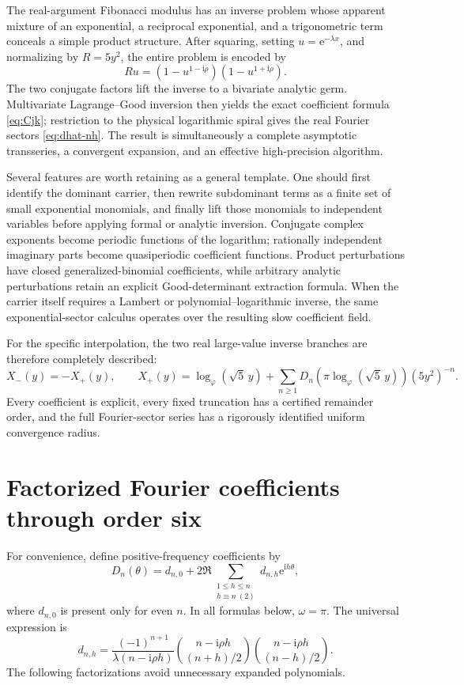 \documentclass[11pt,oneside]{article}
\numberwithin{equation}{section}
\theoremstyle{plain}
\theoremstyle{definition}
\theoremstyle{remark}
\newcommand{\e}{\mathrm e}
\newcommand{\ii}{\mathrm i}
\begin{document}
The real-argument Fibonacci modulus has an inverse problem whose apparent
mixture of an exponential, a reciprocal exponential, and a trigonometric
term conceals a simple product structure.  After squaring, setting
\(u=\e^{-\lambda x}\), and normalizing by \(R=5y^2\), the entire problem is
encoded by
\[
 Ru=(1-u^{1-\ii\rho})(1-u^{1+\ii\rho}).
\]
The two conjugate factors lift the inverse to a bivariate analytic germ.
Multivariate Lagrange--Good inversion then yields the exact coefficient
formula \cref{eq:Cjk}; restriction to the physical logarithmic spiral gives
the real Fourier sectors \cref{eq:dhat-nh}.  The result is simultaneously a
complete asymptotic transseries, a convergent expansion, and an effective
high-precision algorithm.

Several features are worth retaining as a general template.  One should
first identify the dominant carrier, then rewrite subdominant terms as a
finite set of small exponential monomials, and finally lift those monomials
to independent variables before applying formal or analytic inversion.
Conjugate complex exponents become periodic functions of the logarithm;
rationally independent imaginary parts become quasiperiodic coefficient
functions.  Product perturbations have closed generalized-binomial
coefficients, while arbitrary analytic perturbations retain an explicit
Good-determinant extraction formula.  When the carrier itself requires a
Lambert or polynomial--logarithmic inverse, the same exponential-sector
calculus operates over the resulting slow coefficient field.

For the specific interpolation, the two real large-value inverse branches
are therefore completely described:
\[
 X_-(y)=-X_+(y),
 \qquad
 X_+(y)=\log_{\varphi}(\sqrt5\,y)
 +\sum_{n\ge1}D_n\!\left(
   \pi\log_{\varphi}(\sqrt5\,y)
 \right)(5y^2)^{-n}.
\]
Every coefficient is explicit, every fixed truncation has a certified
remainder order, and the full Fourier-sector series has a rigorously
identified uniform convergence radius.

\appendix

\section{Factorized Fourier coefficients through order six}\label{app:coefficients}

For convenience, define positive-frequency coefficients by
\begin{equation}\label{eq:appendix-positive}
 D_n(\theta)=d_{n,0}+
 2\Re\sum_{\substack{1\le h\le n\\h\equiv n\ (2)}}
 d_{n,h}\e^{\ii h\theta},
\end{equation}
where \(d_{n,0}\) is present only for even \(n\).  In all formulas below,
\(\omega=\pi\).  The universal expression is
\begin{equation}\label{eq:appendix-dnh-general}
 d_{n,h}=\frac{(-1)^{n+1}}{\lambda(n-\ii\rho h)}
 \binom{n-\ii\rho h}{(n+h)/2}
 \binom{n-\ii\rho h}{(n-h)/2}.
\end{equation}
The following factorizations avoid unnecessary expanded polynomials.
\end{document}
